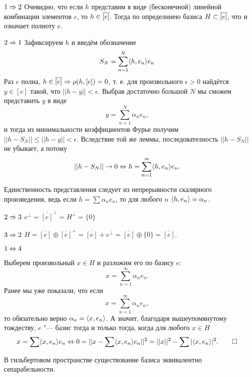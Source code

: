 \documentclass[main]{subfiles}
\begin{document}
\begin{itemproof}
\item[\( 1 \Rightarrow 2 \)]
  Очевидно, что если \( h \) представим в виде
  (бесконечной) линейной комбинации элементов \( e \), то
  \( h \in \overline{[e]} \). Тогда по определниею базиса
  \( H \subset \overline{[e]} \), что и означает полноту \( e \).
\item[\( 2 \Rightarrow 1 \)]
  Зафиксируем \( h \) и введём обозначение
  \[
    S_N = \sum_{n = 1}^N \langle h, e_n \rangle e_n
  \]
  Раз \( e \) полна, \( h \in \overline{[e]} \Rightarrow \rho(h, [e]) = 0 \),
  т. е. для произвольного \( \epsilon > 0 \) найдётся
  \( y \in [e] \) такой, что \( ||h - y|| < \epsilon \).
  Выбрав достаточно большой \( N \) мы сможем представить
  \( y \) в виде
  \[
    y = \sum_{n=1}^N \alpha_n e_n,
  \]
  и тогда из минимальности коэффициентов Фурье получим
  \( ||h - S_N|| \le ||h - y|| < \epsilon \).
  Вследствие той же леммы, последователность
  \( ||h - S_N|| \)
  не убывает, а потому
  \[
    ||h - S_N|| \to 0 \Leftrightarrow h = \sum_{n = 1}^\infty \langle h, e_n \rangle e_n.
  \]

  Единственность представления следует из непрерывности
  скалярного произведения, ведь если 
  \( h = \sum \alpha_n e_n \), то для любого \( n \)
  \( \langle h, e_n \rangle = \alpha_n  \).
\item[\( 2 \Rightarrow 3 \)] \( e^\perp = \overline{[e]}^\perp = H^\perp = \{ 0 \} \)
\item[\( 3 \Rightarrow 2 \)] \( H = \overline{[e]} \oplus \overline{[e]}^\perp =
  \overline{[e]} + e^\perp = \overline{[e]} \oplus \{ 0 \} = \overline{[e]} \).

\item[\( 1 \Leftrightarrow 4 \)]

  Выберем произвольный \( x \in H \) и разложим его по базису \( e \):
  \[
    x = \sum_{n=1}^\infty \alpha_n e_n.
  \]
  Ранее мы уже показали, что если
  \[
    x = \sum_{n=1}^\infty \alpha_n e_n,
  \]
  то обязательно верно \( \alpha_n = \langle x, e_n \rangle \).
  А значит, благодаря вышеупомянутому тождеству,
  \( e \) "--- базис тогда и только тогда, когда
  для любого \( x \in H \)
  \[
    x = \sum \langle x, e_n \rangle e_n
    \Leftrightarrow 
    0 = ||x - \sum \langle x, e_n \rangle e_n||^2 =
    ||x||^2 - \sum |\langle x, e_n \rangle|^2. \qedhere
  \]
\end{itemproof}

\begin{theorem*}
  В гильбертовом пространстве
  существование базиса эквивалентно сепарабельности.
\end{theorem*}
\end{document}
